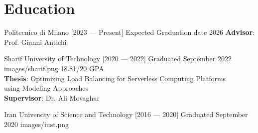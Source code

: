 \section{Education}
{Politecnico di Milano [2023 --- Present]}
{Expected Graduation date 2026}
{}
{\multilineCell
	{\hspace{5mm} \textbf{Advisor}: Prof. Gianni Antichi}
}

{Sharif University of Technology [2020 --- 2022]}
{Graduated September 2022}
{images/sharif.png}
{\multilineCell
	{\hspace{5mm} 18.81/20 GPA \\
        \hspace{5mm} \textbf{Thesis}:
        Optimizing Load Balancing for Serverless Computing Platforms \\
        \hspace{10mm} using Modeling Approaches \\
        \hspace{5mm} \textbf{Supervisor}: Dr. Ali Movaghar}
}

{Iran University of Science and Technology [2016 --- 2020]}
{Graduated September 2020}
{images/iust.png}
{
}
\vspace{-5mm}


